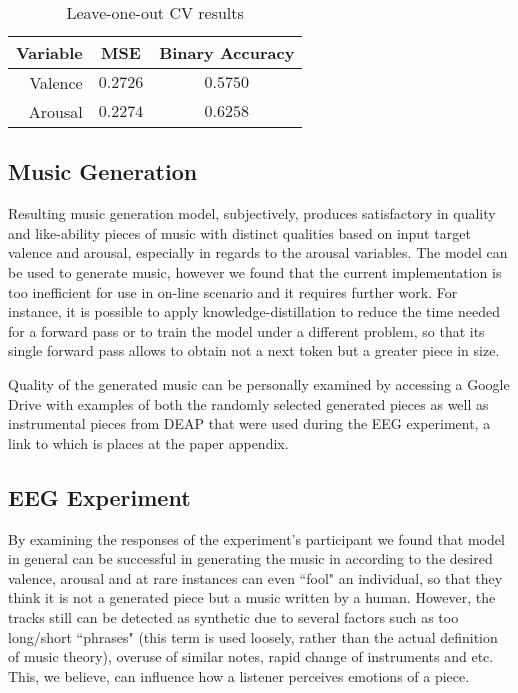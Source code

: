 \documentclass[14pt]{extreport}
\begin{document}
\begin{table}[h!]
    \centering
\begin{tabular}{|r |c |c|}
\hline
    Variable &MSE & Binary Accuracy \\
    \hline
    Valence & $0.2726$ & $0.5750$ \\ 
    Arousal & $0.2274$ & $0.6258$ \\ 
\hline
\end{tabular}
    \caption{Leave-one-out CV results}
    \label{table:2}
\end{table}

\subsection{Music Generation}
Resulting music generation model, subjectively, produces satisfactory in quality and like-ability pieces of music with distinct qualities based on input target valence and arousal, especially in regards to the arousal variables. The model can be used to generate music, however we found that the current implementation is too inefficient for use in on-line scenario and it requires further work. For instance, it is possible to apply knowledge-distillation to reduce the time needed for a forward pass or to train the model under a different problem, so that its single forward pass allows to obtain not a next token but a greater piece in size.

Quality of the generated music can be personally examined by accessing a Google Drive with examples of both the randomly selected generated pieces as well as instrumental pieces from DEAP that were used during the EEG experiment, a link to which is places at the paper appendix.

\subsection{EEG Experiment}
By examining the responses of the experiment's participant we found that model in general can be successful in generating the music in according to the desired \gls{valence}, \gls{arousal} and at rare instances can even ``fool" an individual, so that they think it is not a generated piece but a music written by a human.  However, the tracks still can be detected as synthetic due to several factors such as too long/short ``phrases" (this term is used loosely, rather than the actual definition of music theory), overuse of similar notes, rapid change of instruments and etc. This, we believe, can influence how a listener perceives emotions of a piece. 
\end{document}
